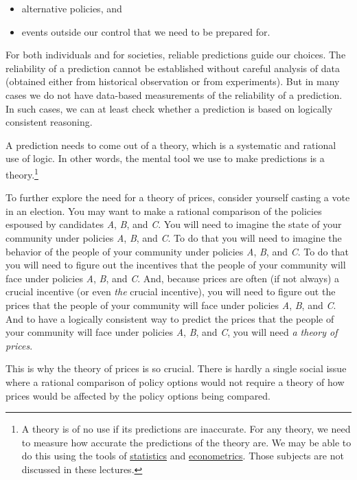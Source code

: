 \documentclass[
  letterpaper,
]{book}
\providecommand{\tightlist}{%
  \setlength{\itemsep}{0pt}\setlength{\parskip}{0pt}}\usepackage{longtable,booktabs,array}
\begin{document}
\begin{itemize}
\tightlist
\item
  alternative policies, and
\item
  events outside our control that we need to be prepared for.
\end{itemize}

For both individuals and for societies, reliable predictions guide our
choices. The reliability of a prediction cannot be established without
careful analysis of data (obtained either from historical observation or
from experiments). But in many cases we do not have data-based
measurements of the reliability of a prediction. In such cases, we can
at least check whether a prediction is based on logically consistent
reasoning.

A prediction needs to come out of a theory, which is a systematic and
rational use of logic. In other words, the mental tool we use to make
predictions is a theory.\footnote{A theory is of no use if its
  predictions are inaccurate. For any theory, we need to measure how
  accurate the predictions of the theory are. We may be able to do this
  using the tools of
  \href{https://en.wikipedia.org/wiki/Statistics}{statistics} and
  \href{https://en.wikipedia.org/wiki/Econometrics}{econometrics}. Those
  subjects are not discussed in these lectures.}

To further explore the need for a theory of prices, consider yourself
casting a vote in an election. You may want to make a rational
comparison of the policies espoused by candidates \emph{A}, \emph{B},
and \emph{C}. You will need to imagine the state of your community under
policies \emph{A}, \emph{B}, and \emph{C}. To do that you will need to
imagine the behavior of the people of your community under policies
\emph{A}, \emph{B}, and \emph{C}. To do that you will need to figure out
the incentives that the people of your community will face under
policies \emph{A}, \emph{B}, and \emph{C}. And, because prices are often
(if not always) a crucial incentive (or even \emph{the} crucial
incentive), you will need to figure out the prices that the people of
your community will face under policies \emph{A}, \emph{B}, and
\emph{C}. And to have a logically consistent way to predict the prices
that the people of your community will face under policies \emph{A},
\emph{B}, and \emph{C}, you will need \emph{a theory of prices}.

This is why the theory of prices is so crucial. There is hardly a single
social issue where a rational comparison of policy options would not
require a theory of how prices would be affected by the policy options
being compared.
\end{document}
